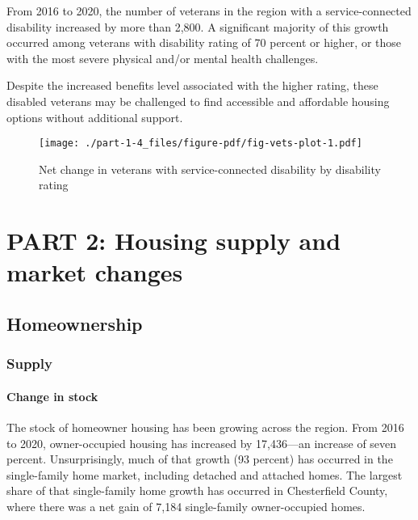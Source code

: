 \documentclass[
  letterpaper,
  DIV=11,
  numbers=noendperiod]{scrreprt}
\begin{document}
From 2016 to 2020, the number of veterans in the region with a
service-connected disability increased by more than 2,800. A significant
majority of this growth occurred among veterans with disability rating
of 70 percent or higher, or those with the most severe physical and/or
mental health challenges.

Despite the increased benefits level associated with the higher rating,
these disabled veterans may be challenged to find accessible and
affordable housing options without additional support.

\begin{figure}

{\centering \texttt{[image: ./part-1-4\_files/figure-pdf/fig-vets-plot-1.pdf]}

}

\caption{\label{fig-vets-plot}Net change in veterans with
service-connected disability by disability rating}

\end{figure}

\part{PART 2: Housing supply and market changes}

\hypertarget{part-2-1}{%
\chapter{Homeownership}\label{part-2-1}}

\hypertarget{supply}{%
\section{Supply}\label{supply}}

\hypertarget{change-in-stock}{%
\subsection{Change in stock}\label{change-in-stock}}

The stock of homeowner housing has been growing across the region. From
2016 to 2020, owner-occupied housing has increased by 17,436---an
increase of seven percent. Unsurprisingly, much of that growth (93
percent) has occurred in the single-family home market, including
detached and attached homes. The largest share of that single-family
home growth has occurred in Chesterfield County, where there was a net
gain of 7,184 single-family owner-occupied homes.
\end{document}

